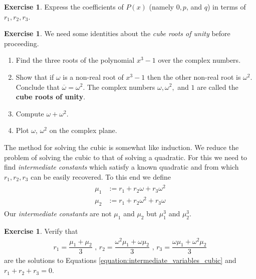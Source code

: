 \documentclass[reqno, 12pt, letter]{article}
\theoremstyle{plain}
\theoremstyle{definition}
\newtheorem{exercise}[theorem]{Exercise}
\theoremstyle{remark}
\numberwithin{equation}{section}
\begin{document}
\begin{exercise}
	\label{exercise:coefficients_depressed_cubic}
	Express the coefficients of $P(x)$ (namely $ 0,p$, and $q$) in terms of $ r_1, r_2, r_3$.
\end{exercise}

\begin{exercise}
	\label{exercise:cube_roots_of_unity}
	We need some identities about the \emph{cube roots of unity} before proceeding.
	\begin{enumerate}
		\item Find the three roots of the polynomial $ x^3 - 1$ over the complex numbers.
		\item Show that if $ \omega $ is a non-real root of $x^3 -1$ then the other non-real root is $ \omega^2$. Conclude that $ \overline{\omega} = \omega^2$.
		      The complex numbers $\omega, \omega^2,$ and $1$ are called the \textbf{cube roots of unity}.
		\item Compute $ \omega + \omega^2$.
		\item Plot $ \omega$, $\omega^2$ on the complex plane.
	\end{enumerate}
\end{exercise}
The method for solving the cubic is somewhat like induction. We reduce the problem of solving the cubic to that of solving a quadratic. For this we need to find \emph{intermediate constants} which satisfy a known {quadratic} and from which $r_1,r_2,r_3$ can be easily recovered. To this end we define
\begin{align}
	\label{equation:intermediate_variables_cubic}
	\begin{split}
		\mu_1 &:= r_1 + r_2 \omega + r_3 \omega^2 \\
		\mu_2 &:= r_1 + r_2 \omega^2 + r_3 \omega
	\end{split}
\end{align}
Our \emph{intermediate constants} are not $ \mu_1$ and $ \mu_2$ but $ \mu_1^3$ and $ \mu_2^3$.


\begin{exercise}
	Verify that
	\begin{align}
		\label{equation:intermediate_variables_cubic_1}
		r_1 = \dfrac{\mu_1 + \mu_2}{3}
		\mbox { , } r_2 = \dfrac{\omega^2 \mu_1 + \omega \mu_2}{3}
		\mbox { , } r_3 = \dfrac{\omega \mu_1 + \omega^2 \mu_2}{3}
	\end{align}
	are the solutions to Equations \eqref{equation:intermediate_variables_cubic} and $ r_1 + r_2 + r_3 = 0$.
\end{exercise}
\end{document}
